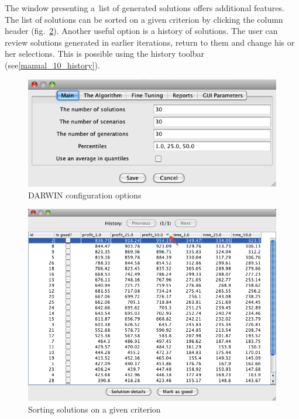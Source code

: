 The window presenting a~list of generated solutions offers additional
features. The list of solutions can be sorted on a given criterion by clicking
the column header (fig.~\ref{manual_09_sorton}). Another useful option is a
history of solutions. The user can review solutions generated in earlier
iterations, return to them and change his or her selections. This is possible
using the history toolbar (see\ref{manual_10_history}).

\begin{figure}
  \centering
  \includegraphics[scale=0.7]{img/manual/08_options}
  \caption{DARWIN configuration options}
  \label{manual_08_options}
\end{figure}

\begin{figure}
  \centering
  \includegraphics[scale=0.7]{img/manual/09_sorton}
  \caption{Sorting solutions on a given criterion}
  \label{manual_09_sorton}
\end{figure}

